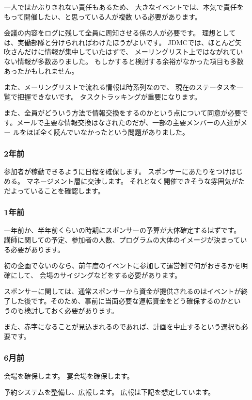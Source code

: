 \documentclass[mingoth,a4paper]{jsarticle}
\begin{document}
一人ではかぶりきれない責任もあるため、
大きなイベントでは、本気で責任をもって開催したい、と思っている人が複数
いる必要があります。

会議の内容をログに残して全員に周知させる係の人が必要です。
理想としては、実働部隊と分けられればわけたほうがよいです。
JDMCでは、ほとんど矢吹さんだけに情報が集中していたはずで、
メーリングリスト上ではながれていない情報が多数ありました。
もしかすると検討する余裕がなかった項目も多数あったかもしれません。

また、メーリングリストで流れる情報は時系列なので、
現在のステータスを一覧で把握できないです。
タスクトラッキングが重要になります。

また、全員がどういう方法で情報交換をするのかという点について同意が必要で
す。メールで主要な情報交換はなされたのだが、一部の主要メンバーの人達がメー
ルをほぼ全く読んでいなかったという問題がありました。


\subsubsection{2年前}
参加者が稼動できるように日程を確保します。
スポンサーにあたりをつけはじめる。
マネージメント層に交渉します。
それとなく開催できそうな雰囲気がただよっていることを確認します。

\subsubsection{1年前}

一年前か、半年前くらいの時期にスポンサーの予算が大体確定するはずです。
講師に関しての予定、参加者の人数、プログラムの大体のイメージが決まってい
る必要があります。

初の企画でないのなら、前年度のイベントに参加して運営側で何がおきるかを明確にして、
会場のサイジングなどをする必要があります。

スポンサーに関しては、通常スポンサーから資金が提供されるのはイベントが終
了した後です。そのため、事前に当面必要な運転資金をどう確保するのかとい
うのも検討しておく必要があります。

また、赤字になることが見込まれるのであれば、計画を中止するという選択も必
要です。

\subsubsection{6月前}

会場を確保します。
宴会場を確保します。

予約システムを整備し、広報します。
広報は下記を想定しています。
\end{document}
